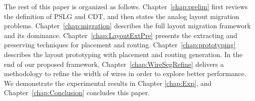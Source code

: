   The rest of this paper is organized as follows. 
  Chapter~\ref{chap:prelim} first reviews the definition of PSLG and CDT, and then states the analog layout migration problems. 
  Chapter~\ref{chap:migration} describes the full layout migration framework and its dominance.
  Chapter~\ref{chap:LayoutExtPre} presents the extracting and preserving techniques for placement and routing. 
  Chapter~\ref{chap:prototyping} describes the layout prototyping with placement and routing generation. In the end of our proposed framework, Chapter~\ref{chap:WireSegRefine} delivers a methodology to refine the width of wires in order to explore better performance. 
  We demonstrate the experimental results in Chapter \ref{chap:Exp}, and Chapter~\ref{chap:Conclusion} concludes this paper. 